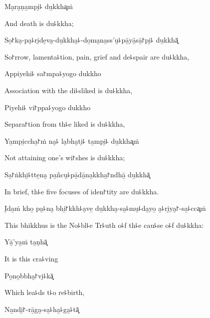 Ma̮ra̮ṇa̱mpi̮꜕ du̱kkha͓ṁ

\begin{english}
  And death is du꜕kkha;
\end{english}

So̱꜓ka̮-pa̮꜕ri̮de̱va̮-du̱kkha̮꜕-do̱ma̮na̱ss'u̮꜕pā̱yā̱sā̱꜓pi̮꜕ du̱kkhā͓

\begin{english}
  So꜓rrow, lamenta꜕tion, pain, grief and de꜕spair are du꜕kkha,
\end{english}

Appiyehi꜕ sa꜓mpa꜕yogo dukkho

\begin{english}
  Association with the di꜕sliked is du꜕kkha,
\end{english}

\ifaivedition
\clearpage
\fi

Piyehi꜕ vi꜓ppa꜕yogo dukkho

\begin{english}
  Separa꜓tion from th꜕e liked is du꜕kkha,
\end{english}

Ya̱mpi̱ccha̱꜓ṁ na̮꜕ la̮bha̮ti̮꜕ ta̱mpi̮꜕ du̱kkha͓ṁ

\begin{english}
  Not attaining one's wi꜓shes is du꜕kkha;
\end{english}

Sa̱꜓ṅkhi̱꜕tte̱na̮ pa̱ñcu̮꜕pā̱dā̱na̱kkha̱꜓ndhā̱ du̱kkhā͓

\begin{english}
  In brief, th꜕e five focuses of iden꜓tity are du꜕kkha.
\end{english}

I̮da̱ṁ kho̱ pa̮꜕na̮ bhi̱꜓kkh꜕a̮ve̱ du̱kkha̮-sa̮꜕mu̮꜕da̮yo̱ a̮꜕ri̮ya̮꜓-sa̱꜕cca͓ṁ

\begin{english}
  This bhikkhus is the No꜕bl꜕e Tr꜕uth o꜕f th꜕e cau꜕se o꜕f du꜕kkha:
\end{english}

Yā̱'ya̱ṁ ta̱ṇhā͓

\begin{english}
  It is this cra꜕ving
\end{english}

Po̱no̱bbha̮꜓vi̮꜕kā͓

\begin{english}
  Which lea꜕ds t꜕o re꜕birth,
\end{english}

Na̱ndi̮꜓-rā̱ga̮-sa̮꜕ha̮꜕ga̮꜕tā͓

